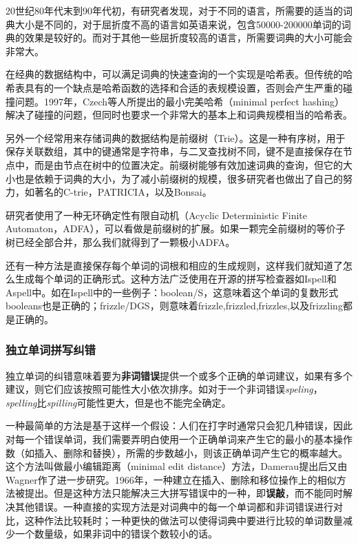 \documentclass[UTF8,a4paper]{ctexart}
\begin{document}
20世纪80年代末到90年代初，有研究者发现，对于不同的语言，所需要的适当的词典大小是不同的，对于屈折度不高的语言如英语来说，包含50000-200000单词的词典的效果是较好的\cite{damerau1989examination,damerau1990evaluating,peterson1986note}。而对于其他一些屈折度较高的语言，所需要词典的大小可能会非常大。

在经典的数据结构中，可以满足词典的快速查询的一个实现是哈希表\cite{knuthart}。但传统的哈希表具有的一个缺点是哈希函数的选择和合适的表规模设置，否则会产生严重的碰撞问题。1997年，Czech等人\cite{czech1997perfect}所提出的最小完美哈希（minimal perfect hashing）解决了碰撞的问题，但同时也要求一个非常大的基本上和词典规模相当的哈希表。

另外一个经常用来存储词典的数据结构是前缀树（Trie）\cite{knuthart}。这是一种有序树，用于保存关联数组，其中的键通常是字符串，与二叉查找树不同，键不是直接保存在节点中，而是由节点在树中的位置决定。前缀树能够有效加速词典的查询，但它的大小也是依赖于词典的大小，为了减小前缀树的规模，很多研究者也做出了自己的努力，如著名的C-trie\cite{maly1976compressed}，PATRICIA\cite{morrison1968patricia}，以及Bonsai\cite{darragh1993bonsai}。

研究者使用了一种无环确定性有限自动机（Acyclic Deterministic Finite Automaton，ADFA）\cite{deorowicz2005correcting}，可以看做是前缀树的扩展。如果一颗完全前缀树的等价子树已经全部合并，那么我们就得到了一颗极小ADFA。

还有一种方法是直接保存每个单词的词根和相应的生成规则，这样我们就知道了怎么生成每个单词的正确形式。这种方法广泛使用在开源的拼写检查器如Ispell\cite{gorin19712003}和Aspell\cite{atkinson2011gnu}中。如在Ispell中的一些例子：boolean/S，这意味着这个单词的复数形式booleans也是正确的；frizzle/DGS，则意味着frizzle,frizzled,frizzles,以及frizzling都是正确的。

\subsubsection{独立单词拼写纠错}
独立单词的纠错意味着要为\textbf{非词错误}提供一个或多个正确的单词建议，如果有多个建议，则它们应该按照可能性大小依次排序。如对于一个非词错误\textit{speling}，\textit{spelling}比\textit{spilling}可能性更大，但是也不能完全确定。

一种最简单的方法是基于这样一个假设：人们在打字时通常只会犯几种错误，因此对每一个错误单词，我们需要弄明白使用一个正确单词来产生它的最小的基本操作数（如插入、删除和替换），所需的步数越小，则该正确单词产生它的概率越大。这个方法叫做最小编辑距离（minimal edit distance）方法\cite{damerau1964technique}，Damerau提出后又由Wagner作了进一步研究\cite{wagner1974string}。1966年，一种建立在插入、删除和移位操作上的相似方法被提出\cite{levenshtein1966binary}。但是这种方法只能解决三大拼写错误中的一种，即\textbf{误敲}，而不能同时解决其他错误。一种直接的实现方法是对词典中的每一个单词都和非词错误进行对比，这种作法比较耗时；一种更快的做法\cite{baeza1998fast}可以使得词典中要进行比较的单词数量减少一个数量级，如果非词中的错误个数较小的话。
\end{document}
